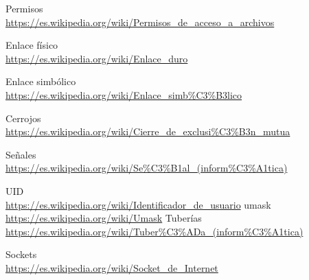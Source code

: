 \begin{thebibliography}{9}
\bibitem{} 
Permisos
\\\url{https://es.wikipedia.org/wiki/Permisos\_de\_acceso\_a\_archivos}

\bibitem{} 
Enlace físico
\\\url{https://es.wikipedia.org/wiki/Enlace\_duro}

\bibitem{} 
Enlace simbólico
\\\url{https://es.wikipedia.org/wiki/Enlace_simb\%C3\%B3lico}

\bibitem{} 
Cerrojos
\\\url{https://es.wikipedia.org/wiki/Cierre_de_exclusi\%C3\%B3n_mutua}

\bibitem{} 
Señales
\\\url{https://es.wikipedia.org/wiki/Se\%C3\%B1al_(inform\%C3\%A1tica)}

\bibitem{} 
UID
\\\url{https://es.wikipedia.org/wiki/Identificador_de_usuario}
\bibitem{} 
umask
\\\url{https://es.wikipedia.org/wiki/Umask}
\bibitem{} 
Tuberías
\\\url{https://es.wikipedia.org/wiki/Tuber\%C3\%ADa_(inform\%C3\%A1tica)}

\bibitem{} 
Sockets
\\\url{https://es.wikipedia.org/wiki/Socket\_de\_Internet}
\end{thebibliography}